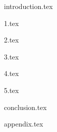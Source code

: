 \documentclass[
  12pt,				         %
  oneside,			       %
  a4paper,			       %
  article,
  english,		       	 %
  brazil,			      	 %
]{abntex2}
\begin{document}
 

    \renewcommand{\thesection}{\noindent\arabic{chapter}.\arabic{section}}



    \frenchspacing
    
    \imprimircapa
    \tableofcontents*
    \cleardoublepage
    \textual
    \newpage
    

    {introduction.tex}


    {1.tex}
    
    {2.tex}

    {3.tex}

    {4.tex}

    {5.tex}


    {conclusion.tex}

    \postextual


    


    {appendix.tex}


    \printindex
\end{document}
